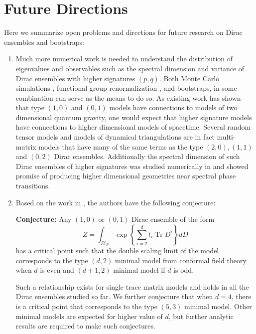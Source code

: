 \documentclass[11pt]{article}
\theoremstyle{plain}
\DeclareMathOperator{\tr}{Tr}
\begin{document}
\section{Future Directions}

Here we summarize open problems and directions for future research on Dirac ensembles and bootstraps:
\begin{enumerate}
	
	\item Much more numerical work is needed to  understand the distribution of eigenvalues and observables such as the spectral dimension and variance of Dirac ensembles with higher signatures $(p,q)$. Both Monte Carlo simulations \cite{Barrett2016,glaser}, functional group renormalization \cite{Sanchez functional renormalization}, and bootstraps, \cite{hessam2022bootstrapping} in some combination can serve as the means to do so. As existing work has shown that type $(1,0)$ and $(0,1)$ models have connections to models of two dimensional quantum gravity, one would expect that higher signature models have connections to higher dimensional models of spacetime. Several random tensor models and models of dynamical triangulations are in fact multi-matrix models that have many of the same terms as the type $(2,0), (1,1)$ and $(0,2)$ Dirac ensembles. Additionally the spectral dimension of such Dirac ensembles of higher signatures was studied numerically in \cite{Spectral estimators} and showed  promise of producing higher dimensional geometries near spectral phase transitions.
	\item Based on the work in \cite{hessam2023double}, the authors have the following conjecture:

{\bf Conjecture:}
		Any $(1,0)$ or $(0,1)$ Dirac ensemble of the form 
		\begin{equation*}
			Z = \int_{\mathcal{H}_{N}} \exp\left\{\sum_{i=2}^{d}t_{i}\tr D^{i}\right\}dD
		\end{equation*}
	has a critical point such that the double scaling limit of the model corresponds to the type $(d,2)$ minimal model from conformal field theory when $d$ is even and $(d+1,2)$ minimal model if $d$ is odd. 
	
	Such a relationship exists for single trace matrix models and holds in all the Dirac ensembles studied so far. We further conjecture that when $d=4$, there is a critical point that corresponds to the type $(5,3)$ minimal model. Other minimal models are expected for higher value of $d$, but further analytic results are required to make such conjectures.
 

\end{enumerate}
\end{document}
